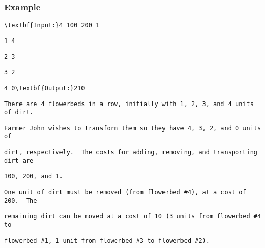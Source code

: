 \subsubsection{Example}
\begin{verbatim}
\textbf{Input:}4 100 200 1 \end{verbatim}
\begin{verbatim}
1 4 \end{verbatim}
\begin{verbatim}
2 3 \end{verbatim}
\begin{verbatim}
3 2 \end{verbatim}
\begin{verbatim}
4 0\textbf{Output:}210\end{verbatim}
\begin{verbatim}
There are 4 flowerbeds in a row, initially with 1, 2, 3, and 4 units of dirt. \end{verbatim}
\begin{verbatim}
Farmer John wishes to transform them so they have 4, 3, 2, and 0 units of \end{verbatim}
\begin{verbatim}
dirt, respectively.  The costs for adding, removing, and transporting dirt are \end{verbatim}
\begin{verbatim}
100, 200, and 1.\end{verbatim}
\begin{verbatim}
One unit of dirt must be removed (from flowerbed #4), at a cost of 200.  The \end{verbatim}
\begin{verbatim}
remaining dirt can be moved at a cost of 10 (3 units from flowerbed #4 to \end{verbatim}
\begin{verbatim}
flowerbed #1, 1 unit from flowerbed #3 to flowerbed #2).\end{verbatim}
